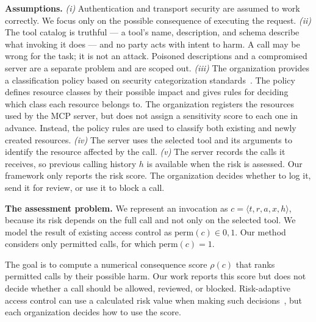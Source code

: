 \documentclass[sigconf]{acmart}
\begin{document}
\textbf{Assumptions.} \emph{(i)} Authentication and transport security are assumed to work correctly. We focus only on the possible consequence of executing the request.
\emph{(ii)} The tool catalog is truthful --- a tool's name,
description, and schema describe what invoking it does --- and no party acts
with intent to harm. A call may be wrong for the task; it is not an attack.
Poisoned descriptions and a compromised server are a separate problem and are
scoped out. \emph{(iii)} The organization provides a classification policy based on security
categorization standards~\cite{nist2004fips199,nist2008sp80060}. The policy
defines resource classes by their possible impact and gives rules for deciding
which class each resource belongs to. The organization registers the resources
used by the MCP server, but does not assign a sensitivity score to each one in
advance. Instead, the policy rules are used to classify both existing and newly
created resources.
\emph{(iv)} The server uses the selected tool and its arguments to identify the
resource affected by the call. \emph{(v)} The server records the calls it
receives, so previous calling history $h$ is available when the risk is
assessed. Our framework only reports the risk score. The organization decides
whether to log it, send it for review, or use it to block a call.

\textbf{The assessment problem.}
We represent an invocation as
$c=\langle t,r,a,x,h\rangle$, because its risk depends on the full call and not
only on the selected tool. We model the result of existing access control as
$\mathrm{perm}(c)\in{0,1}$. Our method considers only permitted calls, for
which $\mathrm{perm}(c)=1$.

The goal is to compute a numerical consequence score $\rho(c)$ that ranks
permitted calls by their possible harm. Our work reports this score but does
not decide whether a call should be allowed, reviewed, or blocked.
Risk-adaptive access control can use a calculated risk value when making such
decisions~\cite{cheng2007fuzzymls,kandala2011radac}, but each organization
decides how to use the score.
\end{document}
